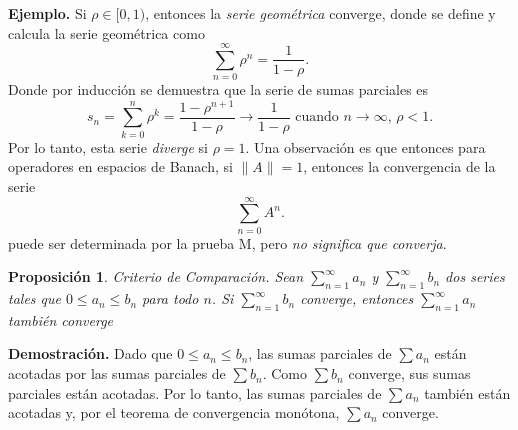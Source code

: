 \documentclass[letterpaper]{book}
\newtheorem{prop}[teorema]{Proposici\'on}
\newcommand{\eje}{{\noindent \sc \textbf{Ejemplo. }}}
\newcommand{\dem}{{\noindent \sc \textbf{Demostraci\'on. }}}
\begin{document}
\eje Si \(\rho\in[0,1)\), entonces la \emph{serie geométrica} converge, donde se define y calcula la serie geométrica como
\[
\sum_{n=0}^{\infty}\rho^n=\frac{1}{1-\rho}.
\]
Donde por inducción se demuestra que la serie de sumas parciales es
\[
s_n=\sum_{k=0}^{n}\rho^k=\frac{1-\rho^{n+1}}{1-\rho}\to\frac{1}{1-\rho}\text{ cuando }n\to\infty,\,\rho<1.
\]
Por lo tanto, esta serie \emph{diverge} si \(\rho=1\). Una observación es que entonces para operadores en espacios de Banach, si \(\|A\|=1\), entonces la convergencia de la serie
\[
\sum_{n=0}^{\infty}A^n.
\]
 puede ser determinada por la prueba M, pero \emph{no significa que converja}.


\begin{prop}{Criterio de Comparación.}
Sean \(\sum_{n=1}^\infty a_n\) y \(\sum_{n=1}^\infty b_n\) dos series tales que \(0 \leq a_n \leq b_n\) para todo \(n\). Si \(\sum_{n=1}^\infty b_n\) converge, entonces \(\sum_{n=1}^\infty a_n\) también converge
\end{prop}
\dem Dado que \(0 \leq a_n \leq b_n\), las sumas parciales de \(\sum a_n\) están acotadas por las sumas parciales de \(\sum b_n\). Como \(\sum b_n\) converge, sus sumas parciales están acotadas. Por lo tanto, las sumas parciales de \(\sum a_n\) también están acotadas y, por el teorema de convergencia monótona, \(\sum a_n\) converge.
\end{document}
